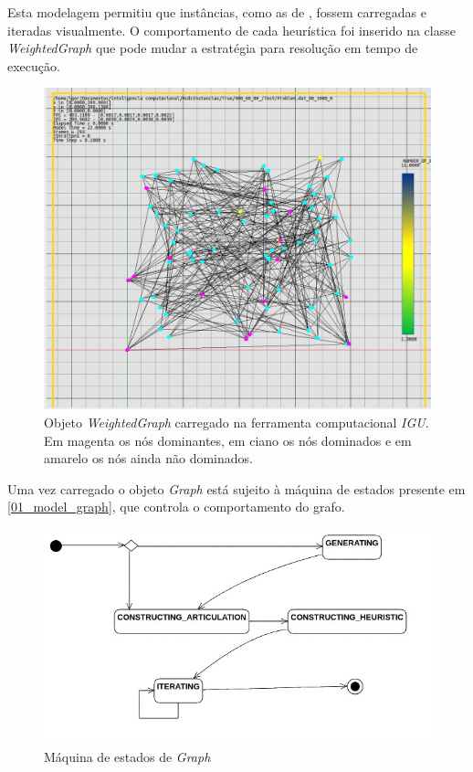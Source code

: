 \documentclass[conference,compsoc]{IEEEtran}
\begin{document}
Esta modelagem permitiu que instâncias, como as de \cite{Jovanovic}, fossem carregadas e iteradas visualmente. O comportamento de cada heurística foi inserido na classe \textit{WeightedGraph} que pode mudar a estratégia para resolução em tempo de execução.

\begin{figure}[!htbp]
    \centering
    \includegraphics[scale=0.15]{IGU_SCREENSHOT__00005.png}
    \caption{Objeto \textit{WeightedGraph} carregado na ferramenta computacional \textit{IGU}. Em magenta os nós dominantes, em ciano os nós dominados e em amarelo os nós ainda não dominados.}
    \label{01_IGU}
\end{figure}

Uma vez carregado o objeto \textit{Graph} está sujeito à máquina de estados presente em \ref{01_model_graph}, que controla o comportamento do grafo.

\begin{figure}[!htbp]
    \centering
    \includegraphics[scale=0.4]{GraphStatus_.jpg}
    \caption{Máquina de estados de \textit{Graph}}
    \label{01_graph_status}
\end{figure}
\end{document}
